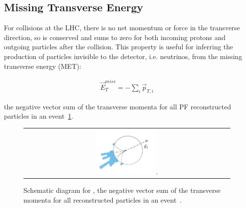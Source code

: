 \subsection{Missing Transverse Energy}
For collisions at the LHC, there is no net momentum or force in the transverse direction, so \pT is conserved and sums to zero for both incoming protons and outgoing particles after the collision.
This property is useful for inferring the production of particles invisible to the detector, i.e. neutrinos, from the missing transverse energy (MET):
\begin{linenomath*}
\begin{align}
\vec{E}_T^{miss}=-\sum_{i} \vec{p}_{T,i}
\end{align}
\end{linenomath*}
the negative vector sum of the transverse momenta for all PF reconstructed particles in an event~\ref{met_schematic}.
\begin{figure}[!htb]
  \begin{center}
    \begin{tabular}{c}
        \includegraphics[width=0.3\textwidth]{fig_Event_Reconstruction/met_schematic.pdf}.
    \end{tabular}
    \caption{Schematic diagram for \MET, the negative vector sum of the transverse momenta for all reconstructed particles in an event~\cite{METSchematicDiagram}.
            }
    \label{met_schematic}
  \end{center}
\end{figure}



